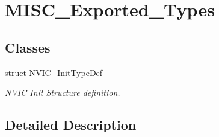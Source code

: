 \hypertarget{group___m_i_s_c___exported___types}{}\section{M\+I\+S\+C\+\_\+\+Exported\+\_\+\+Types}
\label{group___m_i_s_c___exported___types}
\subsection*{Classes}
\begin{DoxyCompactItemize}
\item 
struct \hyperlink{struct_n_v_i_c___init_type_def}{N\+V\+I\+C\+\_\+\+Init\+Type\+Def}
\begin{DoxyCompactList}\small\item\em N\+V\+IC Init Structure definition. \end{DoxyCompactList}\end{DoxyCompactItemize}


\subsection{Detailed Description}
